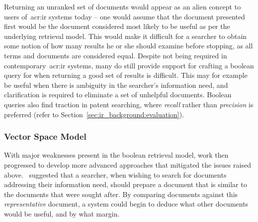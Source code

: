 Returning an unranked set of documents would appear as an alien concept to users of~\gls{acr:ir} systems today -- one would assume that the document presented first would be the document considered most likely to be useful as per the underlying retrieval model. This would make it difficult for a searcher to obtain some notion of how many results he or she should examine before stopping, as all terms and documents are considered equal. Despite not being required in contemporary~\gls{acr:ir} systems, many do still provide support for crafting a boolean query for when returning a good set of results is difficult. This may for example be useful when there is ambiguity in the searcher's information need, and clarification is required to eliminate a set of unhelpful documents. Boolean queries also find traction in patent searching, where \emph{recall} rather than \emph{precision} is preferred (refer to Section~\ref{sec:ir_background:evaluation}).

\subsubsection{Vector Space Model}
With major weaknesses present in the boolean retrieval model, work then progressed to develop more advanced approaches that mitigated the issues raised above.~\cite{luhn1957ranking_query} suggested that a searcher, when wishing to search for documents addressing their information need, should prepare a document that is similar to the documents that were sought after. By comparing documents against this \emph{representative} document, a system could begin to deduce what other documents would be useful, and by what margin.

